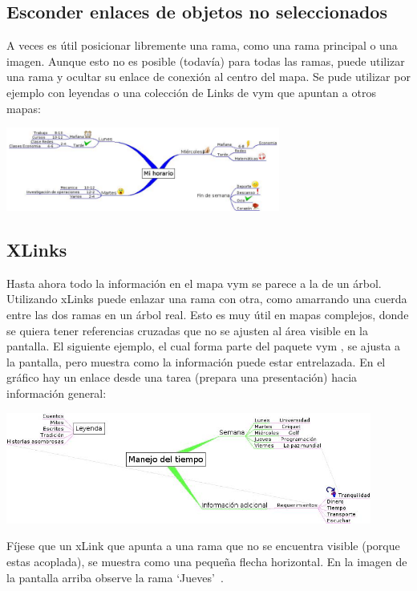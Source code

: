 \documentclass{article}
\newcommand{\vym}{{\sc vym }}
\begin{document}
\subsection{Esconder enlaces de objetos no seleccionados}
A veces es \'util posicionar libremente una rama, como una rama principal o una imagen. Aunque esto no es posible (todav\'ia) para todas las ramas, puede utilizar una rama y ocultar su enlace de conexi\'on al centro del mapa. Se pude utilizar por ejemplo con leyendas o una colecci\'on de Links de \vym que apuntan a otros mapas:

\begin{center}
    \includegraphics[width=9cm]{images/hiddenlink_es.png}
\end{center}


\subsection{XLinks} \label{xlinks}
Hasta ahora todo la informaci\'on en el mapa \vym se parece a la de un \'arbol. Utilizando xLinks puede enlazar una rama con otra, como amarrando una cuerda entre las dos ramas en un \'arbol real. Esto es muy \'util en mapas complejos, donde se quiera tener referencias cruzadas que no se ajusten al \'area visible en la pantalla. El siguiente ejemplo, el cual forma parte del paquete \vym, se ajusta a la pantalla, pero muestra como la informaci\'on puede estar entrelazada. En el gr\'afico hay un enlace desde una tarea (prepara una presentaci\'on) hacia informaci\'on general:

\begin{center}
    \includegraphics[width=12cm]{images/xlink_es.png}
\end{center}
F\'ijese que un xLink que apunta a una rama que no se encuentra visible (porque estas acoplada), se muestra como una peque\~na flecha horizontal. En la imagen de la pantalla arriba observe la rama \lq Jueves\rq\ .
\end{document}
